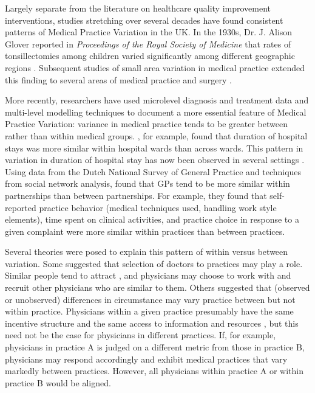 \documentclass[12pt]{article}
\begin{document}
Largely separate from the literature on healthcare quality improvement interventions, studies stretching over several decades have found consistent patterns of Medical Practice Variation in the UK. In the 1930s, Dr. J. Alison Glover reported in \emph{Proceedings of the Royal Society of Medicine} that rates of tonsillectomies among children varied significantly among different geographic regions \citep{gloverIncidenceTonsillectomySchool1938}. Subsequent studies of small area variation in medical practice extended this finding to  several areas of medical practice and surgery \citep{wennbergSmallAreaVariations1973,wennbergVariationsMedicalCare1982,paul-shaheenSmallAreaAnalysis1987,jafferVariationsPerioperativeWarfarin2010,oconnorGeographicVariationTreatment1999}.

More recently, researchers have used microlevel diagnosis and treatment data and multi-level modelling techniques to document a more essential feature of Medical Practice Variation: variance in medical practice tends to be greater between rather than within medical groups. \citet{westertg.p.VariationUseHospital1992}, for example, found that duration of hospital stays was more similar within hospital wards than across wards. This pattern in variation in duration of hospital stay has now been observed in several settings \citep{vandevijselHasVariationLength2015}. Using data from the Dutch National Survey of General Practice and techniques from social network analysis, \citet{dejongMutualInfluencesGeneral2003} found that GPs tend to be more similar within partnerships than between partnerships. For example, they found that self-reported practice behavior (medical techniques used, handling work style elements), time spent on clinical activities, and practice choice in response to a given complaint were more similar within practices than between practices.

Several theories were posed to explain this pattern of within versus between variation. Some suggested that selection of doctors to practices may play a role. Similar people tend to attract \citep{fehrFriendshipProcesses1996}, and physicians may choose to work with and recruit other physicians who are similar to them. Others suggested that (observed or unobserved) differences in circumstance may vary practice between but not within practice. Physicians within a given practice presumably have the same incentive structure and the same access to information and resources \citep{dejongMutualInfluencesGeneral2003}, but this need not be the case for physicians in different practices. If, for example, physicians in practice A is judged on a different metric from those in practice B, physicians may respond accordingly \citep{krasnikChangingRemunerationSystems1990} and exhibit medical practices that vary markedly between practices. However, all physicians within practice A or within practice B would be aligned.
\end{document}
